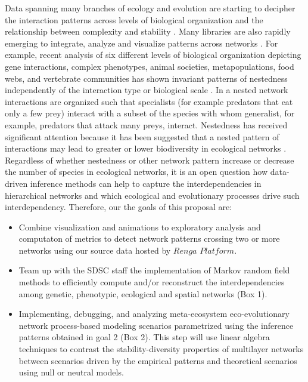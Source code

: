 \documentclass[12pt]{article}
\begin{document}
\begin{center}
Data spanning many branches of ecology and evolution are starting to
decipher the interaction patterns across levels of biological
organization and the relationship between complexity and stability
\citep{Kivelaetal:2014,Ahnetal:2010,DeDomenico:2014,Morrison&Badyaev:2016}. Many
libraries are also rapidly emerging to integrate, analyze and
visualize patterns across networks
\citep{Schneideretal:2011,Kivela:2013,DeDomenico:2014,Kivelaetal:2014}. For
example, recent analysis of six different levels of biological
organization depicting gene interactions, complex phenotypes, animal
societies, metapopulations, food webs, and vertebrate communities has
shown invariant patterns of nestedness independently of the
interaction type or biological scale \citep{Cantoretal:2017}. In a
nested network interactions are organized such that specialists (for
example predators that eat only a few prey) interact with a subset of
the species with whom generalist, for example, predators that attack
many preys, interact. Nestedness has received significant attention
because it has been suggested that a nested pattern of interactions
may lead to greater or lower biodiversity in ecological networks
\citep{Bastollaetal:2009,Staniczenkoetal:2013}. Regardless of whether
nestedness or other network pattern increase or decrease the number of
species in ecological networks, it is an open question how data-driven
inference methods can help to capture the interdependencies in
hierarchical networks and which ecological and evolutionary processes
drive such interdependency. Therefore, our the goals of this proposal are:
\begin{itemize}
\item Combine visualization and animations to exploratory analysis and
  computaton of metrics to detect network patterns crossing two or
  more networks using our source data hosted by $Renga$ $Platform$.
\item Team up with the SDSC staff the implementation of Markov random
  field methods to efficiently compute and/or reconstruct the
  interdependencies among genetic, phenotypic, ecological and spatial
  networks (Box 1).
\item Implementing, debugging, and analyzing meta-ecosystem
  eco-evolutionary network process-based modeling scenarios
  parametrized using the inference patterns obtained in goal 2 (Box
  2). This step will use linear algebra techniques to contrast the
  stability-diversity properties of multilayer networks between
  scenarios driven by the empirical patterns and theoretical scenarios
  using null or neutral models.
\end{itemize}


\end{center}
\end{document}
